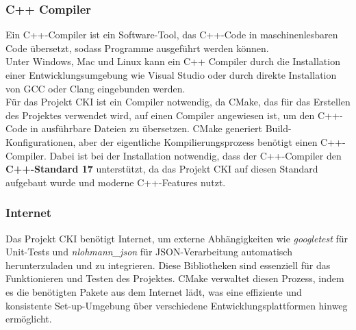 \subsubsection{C++ Compiler}
\label{sec:BuildCCompiler}
Ein C++-Compiler ist ein Software-Tool, das C++-Code in maschinenlesbaren Code übersetzt, sodass Programme ausgeführt werden können. 
\\
Unter Windows, Mac und Linux kann ein C++ Compiler durch die Installation einer Entwicklungsumgebung wie Visual Studio oder durch direkte Installation von GCC oder Clang eingebunden werden. 
\\
Für das Projekt CKI ist ein Compiler notwendig, da CMake, das für das Erstellen des Projektes verwendet wird, auf einen Compiler angewiesen ist, um den C++-Code in ausführbare Dateien zu übersetzen. CMake generiert Build-Konfigurationen, aber der eigentliche Kompilierungsprozess benötigt einen C++-Compiler. Dabei ist bei der Installation notwendig, dass der C++-Compiler den \textbf{C++-Standard 17} unterstützt, da das Projekt CKI auf diesen Standard aufgebaut wurde und moderne C++-Features nutzt.

\subsubsection{Internet}
\label{sec:BuildInternet}
Das Projekt CKI benötigt Internet, um externe Abhängigkeiten wie \textit{googletest} für Unit-Tests und \textit{nlohmann_json} für JSON-Verarbeitung automatisch herunterzuladen und zu integrieren. Diese Bibliotheken sind essenziell für das Funktionieren und Testen des Projektes. CMake verwaltet diesen Prozess, indem es die benötigten Pakete aus dem Internet lädt, was eine effiziente und konsistente Set-up-Umgebung über verschiedene Entwicklungsplattformen hinweg ermöglicht.

